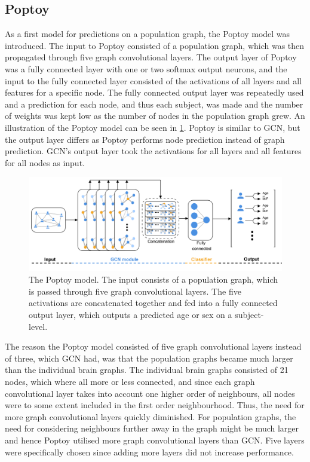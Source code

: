 \subsection{Poptoy}

As a first model for predictions on a population graph, the Poptoy model was introduced. The input to Poptoy consisted of a population graph, which was then propagated through five graph convolutional layers.  The output layer of Poptoy was a fully connected layer with one or two softmax output neurons, and the input to the fully connected layer consisted of the activations of all layers and all features for a specific node. 
The fully connected output layer was repeatedly used and a prediction for each node, and thus each subject, was made and the number of weights was kept low as the number of nodes in the population graph grew. An illustration of the Poptoy model can be seen in \cref{fig:poptoy}. Poptoy is similar to GCN, but the output layer differs as Poptoy performs node prediction instead of graph prediction. GCN's output layer took the activations for all layers and all features for all nodes as input. 

\begin{figure}[!htbp]
    \centering
    \includegraphics[width=\textwidth]{chapters/images_methods/poptoy_v2.png}
    \caption{The Poptoy model. The input consists of a population graph, which is passed through five graph convolutional layers. The five activations are concatenated together and fed into a fully connected output layer, which outputs a predicted age or sex on a subject-level.}
    \label{fig:poptoy}
\end{figure}

The reason the Poptoy model consisted of five graph convolutional layers instead of three, which GCN had, was that the population graphs became much larger than the individual brain graphs. The individual brain graphs consisted of 21 nodes, which where all more or less connected, and since each graph convolutional layer takes into account one higher order of neighbours, all nodes were to some extent included in the first order neighbourhood. Thus, the need for more graph convolutional layers quickly diminished. For population graphs, the need for considering neighbours further away in the graph might be much larger and hence Poptoy utilised more graph convolutional layers than GCN. Five layers were specifically chosen since adding more layers did not increase performance.

